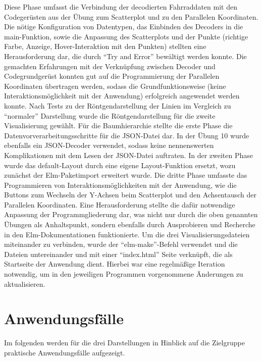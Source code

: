 \documentclass[usegeometry=true]{scrartcl}
\begin{document}
Diese Phase umfasst die Verbindung der decodierten Fahrraddaten mit den Codegerüsten aus der Übung zum Scatterplot und zu den Parallelen Koordinaten. Die nötige Konfiguration von Datentypen, das Einbinden des Decoders in die main-Funktion, sowie die Anpassung des Scatterplots und der Punkte (richtige Farbe, Anzeige, Hover-Interaktion mit den Punkten) stellten eine Herausforderung dar, die durch "`Try and Error"' bewältigt werden konnte. Die gemachten Erfahrungen mit der Verknüpfung zwischen Decoder und Codegrundgerüst konnten gut auf die Programmierung der Parallelen Koordinaten übertragen werden, sodass die Grundfunktionsweise (keine Interaktionsmöglichkeit mit der Anwendung) erfolgreich angewendet werden konnte. Nach Tests zu der Röntgendarstellung der Linien im Vergleich zu "`normaler"' Darstellung wurde die Röntgendarstellung für die zweite Visualisierung gewählt.
Für die Baumhierarchie stellte die erste Phase die Datenvorverarbeitungsschritte für die JSON-Datei dar. In der Übung 10 wurde ebenfalls ein JSON-Decoder verwendet, sodass keine nennenswerten Komplikationen mit dem Lesen der JSON-Datei auftraten. In der zweiten Phase wurde das default-Layout durch eine eigene Layout-Funktion ersetzt, wozu zunächst der Elm-Paketimport erweitert wurde.
Die dritte Phase umfasste das Programmieren von Interaktionsmöglichkeiten mit der Anwendung, wie die Buttons zum Wechseln der Y-Achsen beim Scatterplot und den Achsentausch der Parallelen Koordinaten. Eine Herausforderung stellte die dafür notwendige Anpassung der Programmgliederung dar, was nicht nur durch die oben genannten Übungen als Anhaltspunkt, sondern ebenfalls durch Ausprobieren und Recherche in den Elm-Dokumentationen funktionierte. 
Um die drei Visualisierungsdateien miteinander zu verbinden, wurde der "`elm-make"'-Befehl verwendet und die Dateien untereinander und mit einer "`index.html"' Seite verknüpft, die als Startseite der Anwendung dient. Hierbei war eine regelmäßige Iteration notwendig, um in den jeweiligen Programmen vorgenommene Änderungen zu aktualisieren. 
 
\section{Anwendungsfälle}
Im folgenden werden für die drei Darstellungen in Hinblick auf die Zielgruppe praktische Anwendungsfälle aufgezeigt. 
\end{document}
